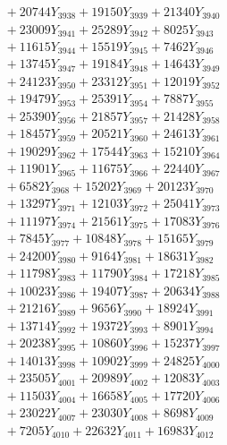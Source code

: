\documentclass[a4paper,10pt]{article}
\begin{document}
{\begin{align}
&\;  + 20744 Y_{3938} + 19150 Y_{3939} + 21340 Y_{3940} \\[0.3ex]
&\;  + 23009 Y_{3941} + 25289 Y_{3942} + 8025 Y_{3943} \\[0.3ex]
&\;  + 11615 Y_{3944} + 15519 Y_{3945} + 7462 Y_{3946} \\[0.3ex]
&\;  + 13745 Y_{3947} + 19184 Y_{3948} + 14643 Y_{3949} \\[0.3ex]
&\;  + 24123 Y_{3950} + 23312 Y_{3951} + 12019 Y_{3952} \\[0.3ex]
&\;  + 19479 Y_{3953} + 25391 Y_{3954} + 7887 Y_{3955} \\[0.3ex]
&\;  + 25390 Y_{3956} + 21857 Y_{3957} + 21428 Y_{3958} \\[0.5ex]\allowbreak
&\;  + 18457 Y_{3959} + 20521 Y_{3960} + 24613 Y_{3961} \\[0.3ex]
&\;  + 19029 Y_{3962} + 17544 Y_{3963} + 15210 Y_{3964} \\[0.3ex]
&\;  + 11901 Y_{3965} + 11675 Y_{3966} + 22440 Y_{3967} \\[0.3ex]
&\;  + 6582 Y_{3968} + 15202 Y_{3969} + 20123 Y_{3970} \\[0.3ex]
&\;  + 13297 Y_{3971} + 12103 Y_{3972} + 25041 Y_{3973} \\[0.3ex]
&\;  + 11197 Y_{3974} + 21561 Y_{3975} + 17083 Y_{3976} \\[0.3ex]
&\;  + 7845 Y_{3977} + 10848 Y_{3978} + 15165 Y_{3979} \\[0.3ex]
&\;  + 24200 Y_{3980} + 9164 Y_{3981} + 18631 Y_{3982} \\[0.3ex]
&\;  + 11798 Y_{3983} + 11790 Y_{3984} + 17218 Y_{3985} \\[0.3ex]
&\;  + 10023 Y_{3986} + 19407 Y_{3987} + 20634 Y_{3988} \\[0.5ex]\allowbreak
&\;  + 21216 Y_{3989} + 9656 Y_{3990} + 18924 Y_{3991} \\[0.3ex]
&\;  + 13714 Y_{3992} + 19372 Y_{3993} + 8901 Y_{3994} \\[0.3ex]
&\;  + 20238 Y_{3995} + 10860 Y_{3996} + 15237 Y_{3997} \\[0.3ex]
&\;  + 14013 Y_{3998} + 10902 Y_{3999} + 24825 Y_{4000} \\[0.3ex]
&\;  + 23505 Y_{4001} + 20989 Y_{4002} + 12083 Y_{4003} \\[0.3ex]
&\;  + 11503 Y_{4004} + 16658 Y_{4005} + 17720 Y_{4006} \\[0.3ex]
&\;  + 23022 Y_{4007} + 23030 Y_{4008} + 8698 Y_{4009} \\[0.3ex]
&\;  + 7205 Y_{4010} + 22632 Y_{4011} + 16983 Y_{4012} \\[0.3ex]

\end{align}}
\end{document}
